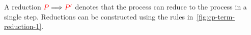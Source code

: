 \begin{definition}\label{def:cp-term-reduction-1}
  A reduction $\textcolor{red}{P}\Longrightarrow\textcolor{red}{P'}$ denotes that the process  can reduce to
  the process  in a single step. Reductions can be constructed using the
  rules in~\cref{fig:cp-term-reduction-1}.
\end{definition}
